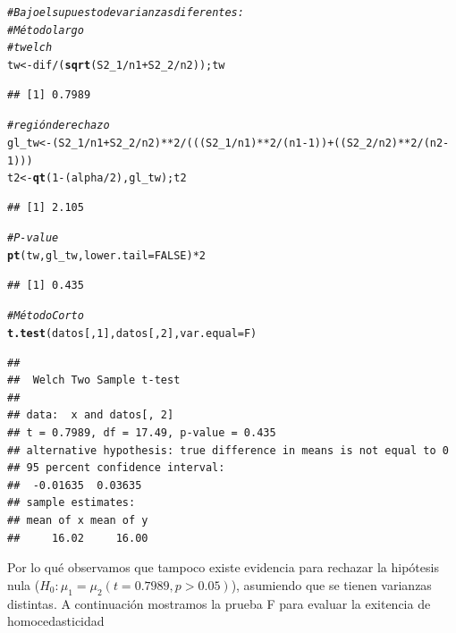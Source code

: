\documentclass[a4paper]{scrartcl}\usepackage[]{graphicx}\usepackage[]{color}
\makeatletter
\newcommand{\hlnum}[1]{\textcolor[rgb]{0.686,0.059,0.569}{#1}}%
\newcommand{\hlcom}[1]{\textcolor[rgb]{0.678,0.584,0.686}{\textit{#1}}}%
\newcommand{\hlopt}[1]{\textcolor[rgb]{0,0,0}{#1}}%
\newcommand{\hlstd}[1]{\textcolor[rgb]{0.345,0.345,0.345}{#1}}%
\newcommand{\hlkwb}[1]{\textcolor[rgb]{0.69,0.353,0.396}{#1}}%
\newcommand{\hlkwc}[1]{\textcolor[rgb]{0.333,0.667,0.333}{#1}}%
\newcommand{\hlkwd}[1]{\textcolor[rgb]{0.737,0.353,0.396}{\textbf{#1}}}%
\newenvironment{kframe}{%
 \def\at@end@of@kframe{}%
 \ifinner\ifhmode%
  \def\at@end@of@kframe{\end{minipage}}%
  \begin{minipage}{\columnwidth}%
 \fi\fi%
 \def\FrameCommand##1{\hskip\@totalleftmargin \hskip-\fboxsep
 \colorbox{shadecolor}{##1}\hskip-\fboxsep
     \hskip-\linewidth \hskip-\@totalleftmargin \hskip\columnwidth}%
 \MakeFramed {\advance\hsize-\width
   \@totalleftmargin\z@ \linewidth\hsize
   \@setminipage}}%
 {\par\unskip\endMakeFramed%
 \at@end@of@kframe}
\newenvironment{knitrout}{}{} %
\makeatother
\begin{document}
\begin{knitrout}
\color{fgcolor}\begin{kframe}
\begin{alltt}
\hlcom{# Bajo el supuesto de varianzas diferentes:}
\hlcom{# Método largo}
\hlcom{# t welch}
\hlstd{tw} \hlkwb{<-} \hlstd{dif} \hlopt{/} \hlstd{(}\hlkwd{sqrt}\hlstd{(S2_1}\hlopt{/}\hlstd{n1} \hlopt{+} \hlstd{S2_2}\hlopt{/}\hlstd{n2)); tw}
\end{alltt}
\begin{verbatim}
## [1] 0.7989
\end{verbatim}
\begin{alltt}
\hlcom{#región de rechazo}
\hlstd{gl_tw} \hlkwb{<-} \hlstd{(S2_1}\hlopt{/}\hlstd{n1} \hlopt{+} \hlstd{S2_2}\hlopt{/}\hlstd{n2)}\hlopt{**}\hlnum{2} \hlopt{/} \hlstd{(((S2_1}\hlopt{/}\hlstd{n1)}\hlopt{**}\hlnum{2}\hlopt{/}\hlstd{(n1} \hlopt{-} \hlnum{1}\hlstd{))} \hlopt{+} \hlstd{((S2_2}\hlopt{/}\hlstd{n2)}\hlopt{**}\hlnum{2}\hlopt{/}\hlstd{(n2}\hlopt{-}\hlnum{1}\hlstd{)))}
\hlstd{t2} \hlkwb{<-} \hlkwd{qt}\hlstd{(}\hlnum{1}\hlopt{-}\hlstd{(alpha}\hlopt{/}\hlnum{2}\hlstd{), gl_tw); t2}
\end{alltt}
\begin{verbatim}
## [1] 2.105
\end{verbatim}
\begin{alltt}
\hlcom{# P-value}
\hlkwd{pt}\hlstd{(tw, gl_tw,} \hlkwc{lower.tail} \hlstd{=} \hlnum{FALSE}\hlstd{)} \hlopt{*} \hlnum{2}
\end{alltt}
\begin{verbatim}
## [1] 0.435
\end{verbatim}
\begin{alltt}
\hlcom{# Método Corto}
\hlkwd{t.test}\hlstd{(datos[,} \hlnum{1}\hlstd{], datos[,} \hlnum{2}\hlstd{],} \hlkwc{var.equal}\hlstd{=F)}
\end{alltt}
\begin{verbatim}
## 
## 	Welch Two Sample t-test
## 
## data:  x and datos[, 2]
## t = 0.7989, df = 17.49, p-value = 0.435
## alternative hypothesis: true difference in means is not equal to 0
## 95 percent confidence interval:
##  -0.01635  0.03635
## sample estimates:
## mean of x mean of y 
##     16.02     16.00
\end{verbatim}
\end{kframe}
\end{knitrout}

\noindent Por lo qué observamos que tampoco existe evidencia para rechazar la hipótesis nula ($H_0: \mu_1 = \mu_2 (t= 0.7989,p>0.05)$), asumiendo que se tienen varianzas distintas. A continuación mostramos la prueba F para evaluar la exitencia de homocedasticidad
\end{document}
